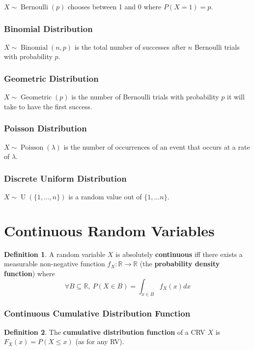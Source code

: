 \documentclass[12pt]{article}
\theoremstyle{definition}
\newtheorem{defn}{Definition}[subsection]
\newcommand{\R}{\mathbb{R}}
\DeclareMathOperator{\Bernoulli}{Bernoulli}
\DeclareMathOperator{\Binomial}{Binomial}
\DeclareMathOperator{\Geometric}{Geometric}
\DeclareMathOperator{\Poisson}{Poisson}
\DeclareMathOperator{\U}{U}
\begin{document}
$X \sim \Bernoulli(p)$ chooses between 1 and 0 where $P(X = 1) = p$.

\subsubsection{Binomial Distribution}

$X \sim \Binomial(n, p)$ is the total number of successes after $n$ Bernoulli trials with probability $p$.

\subsubsection{Geometric Distribution}

$X \sim \Geometric(p)$ is the number of Bernoulli trials with probability $p$ it will take to have the first success.

\subsubsection{Poisson Distribution}

$X \sim \Poisson(\lambda)$ is the number of occurrences of an event that occurs at a rate of $\lambda$.

\subsubsection{Discrete Uniform Distribution}

$X \sim \U(\{1, \ldots, n\})$ is a random value out of $\{1, \ldots n\}$.

\section{Continuous Random Variables}

\begin{defn}
  A random variable $X$ is absolutely \textbf{continuous} iff there exists a measurable non-negative function $f_X : \R \to \R$ (the \textbf{probability density function}) where
  $$\forall B \subseteq \R,\ P(X \in B) = \int_{x \in B}f_X(x)dx$$
\end{defn}

\subsubsection{Continuous Cumulative Distribution Function}

\begin{defn}
  The \textbf{cumulative distribution function} of a CRV $X$ is $F_X(x) = P(X \leq x)$ (as for any RV).
\end{defn}
\end{document}

